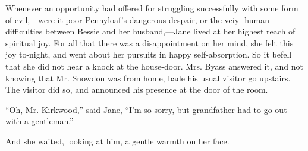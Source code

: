Whenever an opportunity had offered for struggling successfully with
some form of evil,---were it poor Pennyloaf's dangerous despair, or the
veiy- human difficulties between Bessie and her husband,---Jane lived at
her highest {\protect\hypertarget{41}{}{}}reach of spiritual joy. For
all that there was a disappointment on her mind, she felt this joy
to-night, and went about her pursuits in happy self-absorption. So it
befell that she did not hear a knock at the house-door. Mrs. Byass
answered it, and not knowing that Mr. Snowdon was from home, bade his
usual visitor go upstairs. The visitor did so, and announced his
presence at the door of the room.

``Oh, Mr. Kirkwood,'' said Jane, ``I'm so sorry, but grandfather had to
go out with a gentleman.''

And she waited, looking at him, a gentle warmth on her face.
